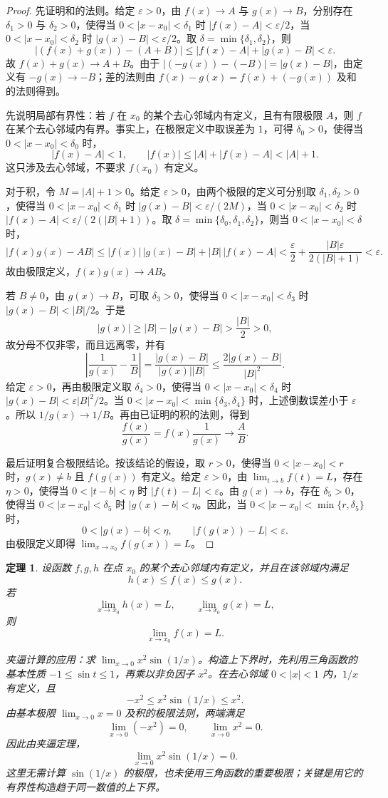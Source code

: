 \documentclass[UTF8,fontset=fandol,11pt]{ctexart}
\newtheorem{theorem}[definition]{定理}
\begin{document}
\begin{proof}
先证明和的法则。给定 $\varepsilon>0$，由 $f(x)\to A$ 与 $g(x)\to B$，分别存在 $\delta_1>0$ 与 $\delta_2>0$，使得当 $0<|x-x_0|<\delta_1$ 时 $|f(x)-A|<\varepsilon/2$，当 $0<|x-x_0|<\delta_2$ 时 $|g(x)-B|<\varepsilon/2$。取 $\delta=\min\{\delta_1,\delta_2\}$，则
\[
\left|(f(x)+g(x))-(A+B)\right|\leq |f(x)-A|+|g(x)-B|<\varepsilon.
\]
故 $f(x)+g(x)\to A+B$。由于 $|(-g(x))-(-B)|=|g(x)-B|$，由定义有 $-g(x)\to-B$；差的法则由 $f(x)-g(x)=f(x)+(-g(x))$ 及和的法则得到。

先说明局部有界性：若 $f$ 在 $x_0$ 的某个去心邻域内有定义，且有有限极限 $A$，则 $f$ 在某个去心邻域内有界。事实上，在极限定义中取误差为 $1$，可得 $\delta_0>0$，使得当 $0<|x-x_0|<\delta_0$ 时，
\[
|f(x)-A|<1,\qquad |f(x)|\leq |A|+|f(x)-A|<|A|+1.
\]
这只涉及去心邻域，不要求 $f(x_0)$ 有定义。

对于积，令 $M=|A|+1>0$。给定 $\varepsilon>0$，由两个极限的定义可分别取 $\delta_1,\delta_2>0$，使得当 $0<|x-x_0|<\delta_1$ 时 $|g(x)-B|<\varepsilon/(2M)$，当 $0<|x-x_0|<\delta_2$ 时 $|f(x)-A|<\varepsilon/(2(|B|+1))$。取 $\delta=\min\{\delta_0,\delta_1,\delta_2\}$，则当 $0<|x-x_0|<\delta$ 时，
\[
|f(x)g(x)-AB|\leq |f(x)|\,|g(x)-B|+|B|\,|f(x)-A|
<\frac{\varepsilon}{2}+\frac{|B|\varepsilon}{2(|B|+1)}<\varepsilon.
\]
故由极限定义，$f(x)g(x)\to AB$。

若 $B\neq0$，由 $g(x)\to B$，可取 $\delta_3>0$，使得当 $0<|x-x_0|<\delta_3$ 时 $|g(x)-B|<|B|/2$。于是
\[
|g(x)|\geq |B|-|g(x)-B|>\frac{|B|}{2}>0,
\]
故分母不仅非零，而且远离零，并有
\[
\left|\frac{1}{g(x)}-\frac{1}{B}\right|=\frac{|g(x)-B|}{|g(x)||B|}\leq\frac{2|g(x)-B|}{|B|^2}.
\]
给定 $\varepsilon>0$，再由极限定义取 $\delta_4>0$，使得当 $0<|x-x_0|<\delta_4$ 时 $|g(x)-B|<\varepsilon|B|^2/2$。当 $0<|x-x_0|<\min\{\delta_3,\delta_4\}$ 时，上述倒数误差小于 $\varepsilon$。所以 $1/g(x)\to1/B$。再由已证明的积的法则，得到
\[
\frac{f(x)}{g(x)}=f(x)\frac{1}{g(x)}\to\frac{A}{B}.
\]

最后证明复合极限结论。按该结论的假设，取 $r>0$，使得当 $0<|x-x_0|<r$ 时，$g(x)\neq b$ 且 $f(g(x))$ 有定义。给定 $\varepsilon>0$，由 $\lim_{t\to b}f(t)=L$，存在 $\eta>0$，使得当 $0<|t-b|<\eta$ 时 $|f(t)-L|<\varepsilon$。由 $g(x)\to b$，存在 $\delta_5>0$，使得当 $0<|x-x_0|<\delta_5$ 时 $|g(x)-b|<\eta$。因此，当 $0<|x-x_0|<\min\{r,\delta_5\}$ 时，
\[
0<|g(x)-b|<\eta,\qquad |f(g(x))-L|<\varepsilon.
\]
由极限定义即得 $\lim_{x\to x_0}f(g(x))=L$。
\end{proof}
\begin{theorem}
设函数 $f,g,h$ 在点 $x_0$ 的某个去心邻域内有定义，并且在该邻域内满足
\[
h(x)\leq f(x)\leq g(x).
\]
若
\[
\lim_{x\to x_0}h(x)=L,
\qquad
\lim_{x\to x_0}g(x)=L,
\]
则
\[
\lim_{x\to x_0}f(x)=L.
\]
\label{thm:squeeze-theorem}

夹逼计算的应用：求 $\lim_{x\to0}x^2\sin(1/x)$。构造上下界时，先利用三角函数的基本性质 $-1\leq\sin t\leq1$，再乘以非负因子 $x^2$。在去心邻域 $0<|x|<1$ 内，$1/x$ 有定义，且
\[
-x^2\leq x^2\sin(1/x)\leq x^2.
\]
由基本极限 $\lim_{x\to0}x=0$ 及积的极限法则，两端满足
\[
\lim_{x\to0}(-x^2)=0,\qquad \lim_{x\to0}x^2=0.
\]
因此由夹逼定理，
\[
\lim_{x\to0}x^2\sin(1/x)=0.
\]
这里无需计算 $\sin(1/x)$ 的极限，也未使用三角函数的重要极限；关键是用它的有界性构造趋于同一数值的上下界。
\end{theorem}
\end{document}
